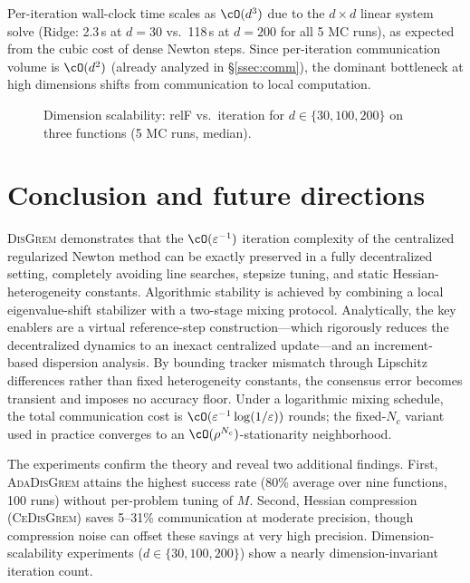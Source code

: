 \documentclass[review,onefignum,onetabnum]{siamart171218}
\begin{document}
	Per-iteration wall-clock time scales as $\cO(d^3)$ due to the
	$d\times d$ linear system solve (Ridge: 2.3\,s at $d{=}30$ vs.\
	118\,s at $d{=}200$ for all 5 MC runs), as expected from the cubic
	cost of dense Newton steps.
	Since per-iteration communication volume is $\cO(d^2)$
	(already analyzed in \S\ref{ssec:comm}), the dominant bottleneck
	at high dimensions shifts from communication to local computation.

	\begin{figure}[htbp]
		\centering
		\caption{Dimension scalability: relF vs.\ iteration for
		$d\in\{30,100,200\}$ on three functions (5 MC runs, median).}
		\label{fig:scalability}
	\end{figure}
	
	
\section{Conclusion and future directions}\label{sec:conclusion}

	\textsc{DisGrem} demonstrates that the $\cO(\varepsilon^{-1})$ iteration
	complexity of the centralized regularized Newton method can be exactly
	preserved in a fully decentralized setting, completely avoiding line searches,
	stepsize tuning, and static Hessian-heterogeneity constants.
	Algorithmic stability is achieved by combining a local eigenvalue-shift
	stabilizer with a two-stage mixing protocol. Analytically, the key
	enablers are a virtual reference-step construction---which rigorously
	reduces the decentralized dynamics to an inexact centralized update---and
	an increment-based dispersion analysis. By bounding tracker mismatch
	through Lipschitz differences rather than fixed heterogeneity constants,
	the consensus error becomes transient and imposes no accuracy floor.
	Under a logarithmic mixing schedule, the total communication cost
	is $\cO(\varepsilon^{-1}\log(1/\varepsilon))$ rounds; the
	fixed-$N_c$ variant used in practice converges to an
	$\cO(\rho^{N_c})$-stationarity neighborhood.

	The experiments confirm the theory and reveal two additional findings.
	First, \textsc{AdaDisGrem} attains the highest success rate
	(80\% average over nine functions, 100 runs) without per-problem
	tuning of $M$.
	Second, Hessian compression (\textsc{CeDisGrem}) saves
	5--31\% communication at moderate precision, though
	compression noise can offset these savings at very high precision.
	Dimension-scalability experiments ($d\in\{30,100,200\}$) show
	a nearly dimension-invariant iteration count.
\end{document}

